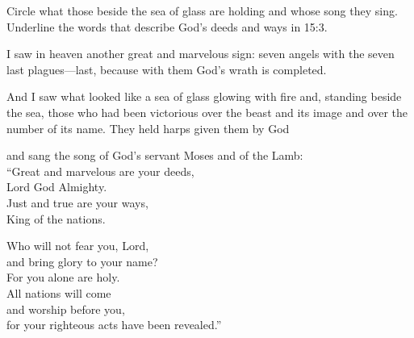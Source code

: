 \begin{ScriptureBox2}{Circle what those beside the sea of glass are holding and whose song they sing. Underline the words that describe God's deeds and ways in 15:3.}

\item[15:1] I saw in heaven another great and marvelous sign: seven angels with the seven last plagues---last, because with them God's wrath is completed.

\item[15:2] And I saw what looked like a sea of glass glowing with fire and, standing beside the sea, those who had been victorious over the beast and its image and over the number of its name. They held harps given them by God

\item[15:3] and sang the song of God's servant Moses and of the Lamb:\\
\hspace*{1em}``Great and marvelous are your deeds,\\
\hspace*{2em}Lord God Almighty.\\
\hspace*{1em}Just and true are your ways,\\
\hspace*{2em}King of the nations.

\item[15:4] \hspace*{1em}Who will not fear you, Lord,\\
\hspace*{2em}and bring glory to your name?\\
\hspace*{1em}For you alone are holy.\\
\hspace*{1em}All nations will come\\
\hspace*{2em}and worship before you,\\
\hspace*{1em}for your righteous acts have been revealed.''


\end{ScriptureBox2}
